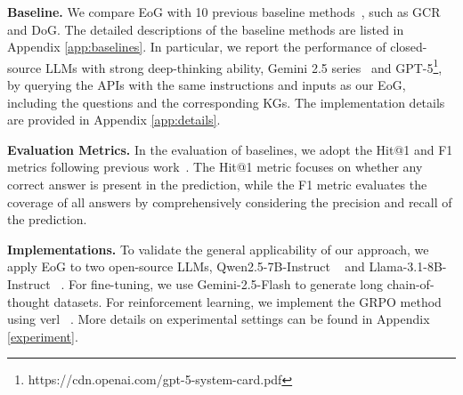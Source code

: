 \textbf{Baseline.} We compare EoG with 10 previous baseline methods~\citep{luo2024rog,sun-etal-2019-pullnet}, such as GCR and DoG. The detailed descriptions of the baseline methods are listed in Appendix 
\ref{app:baselines}. 
In particular, we report the performance of closed-source LLMs with strong deep-thinking ability, Gemini 2.5 series~\citep{comanici2025gemini} and GPT-5\footnote{https://cdn.openai.com/gpt-5-system-card.pdf},
by querying the APIs with the same instructions and inputs as our EoG, including the questions and the corresponding KGs.
The implementation details are provided in Appendix \ref{app:details}.


\textbf{Evaluation Metrics.} In the evaluation of baselines, we adopt the Hit@1 and F1 metrics following previous work~\citep{mavromatis2025gnn}. The Hit@1 metric focuses on whether any correct answer is present in the prediction, while the F1 metric evaluates the coverage of all answers by comprehensively considering the precision and recall of the prediction.

\textbf{Implementations.}
To validate the general applicability of our approach, we apply EoG to two open-source LLMs, Qwen2.5-7B-Instruct ~\citep{yang2024qwen2technicalreport} and Llama-3.1-8B-Instruct ~\citep{dubey2024llama}. For fine-tuning, we use Gemini-2.5-Flash to generate long chain-of-thought datasets. For reinforcement learning, we implement the GRPO method using verl ~\citep{Sheng_2025}. More details on experimental settings can be found in Appendix \ref{experiment}.



